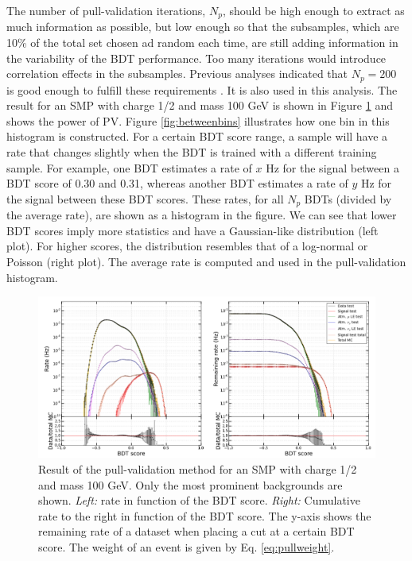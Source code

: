\noindent The number of pull-validation iterations, $N_p$, should be high enough to extract as much information as possible, but low enough so that the subsamples, which are 10\% of the total set chosen ad random each time, are still adding information in the variability of the BDT performance. Too many iterations would introduce correlation effects in the subsamples. Previous analyses indicated that $N_p = 200$ is good enough to fulfill these requirements \cite{Aartsen:2016fep,Aartsen:2015exf}. It is also used in this analysis. The result for an SMP with charge 1/2 and mass 100 GeV is shown in Figure \ref{fig:pullval} and shows the power of PV. Figure \ref{fig:betweenbins} illustrates how one bin in this histogram is constructed. For a certain BDT score range, a sample will have a rate that changes slightly when the BDT is trained with a different training sample. For example, one BDT estimates a rate of $x$ Hz for the signal between a BDT score of 0.30 and 0.31, whereas another BDT estimates a rate of $y$ Hz for the signal between these BDT scores. These rates, for all $N_p$ BDTs (divided by the average rate), are shown as a histogram in the figure. We can see that lower BDT scores imply more statistics and have a Gaussian-like distribution (left plot). For higher scores, the distribution resembles that of a log-normal or Poisson (right plot). The average rate is computed and used in the pull-validation histogram.\\
 
\begin{figure}
\centering
\includegraphics[width=\textwidth]{chapter8/img/pullval_result2_signal_m_100_charge1ovr2.png}
\caption{Result of the pull-validation method for an SMP with charge 1/2 and mass 100 GeV. Only the most prominent backgrounds are shown. \textit{Left: }rate in function of the BDT score. \textit{Right: }Cumulative rate to the right in function of the BDT score. The y-axis shows the remaining rate of a dataset when placing a cut at a certain BDT score. The weight of an event is given by Eq. \ref{eq:pullweight}.}
\label{fig:pullval}
\end{figure}

